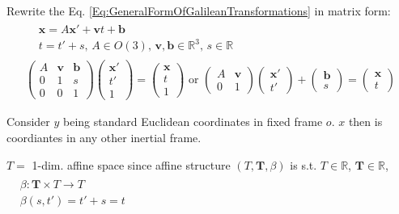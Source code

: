 \documentclass[10pt]{amsart}
\begin{document}
\begin{multicols*}{2}
Rewrite the Eq. \ref{Eq:GeneralFormOfGalileanTransformations} in matrix form:
\[
\begin{gathered}
\begin{aligned}
& \mathbf{x} = A \mathbf{x}' + \mathbf{v} t + \mathbf{b} \\ 
& t = t'+ s, \, A \in O(3), \, \mathbf{v}, \mathbf{b} \in \mathbb{R}^3, \, s \in \mathbb{R}
\end{aligned} \\
\left( \begin{matrix} A & \mathbf{v} & \mathbf{b} \\ 0 & 1 & s \\ 0 & 0 & 1 \end{matrix} \right) \left(\begin{matrix} \mathbf{x}' \\ t' \\ 1 \end{matrix} \right) = \left( \begin{matrix} \mathbf{x} \\ t  \\ 1 \end{matrix} \right) \text{ or } \left( \begin{matrix} A & \mathbf{v} \\  0 & 1 \end{matrix} \right) \left( \begin{matrix}\mathbf{x}' \\ t' \end{matrix} \right) + \left( \begin{matrix} \mathbf{b} \\ s \end{matrix} \right) = \left(\begin{matrix} \mathbf{x} \\ t \end{matrix} \right)
\end{gathered}
\]

Consider $y$ being standard Euclidean coordinates in fixed frame $o$. $x$ then is coordiantes in any other inertial frame.

$T =$ 1-dim. affine space since affine structure $(T, \mathbf{T}, \beta)$ is s.t. $T\in \mathbb{R}$, $\mathbf{T} \in \mathbb{R}$, $\begin{aligned} & \quad \\ 
& \beta : \mathbf{T} \times T \to T \\
& \beta(s,t') = t' + s = t\end{aligned}$ \\




\end{multicols*}
\end{document}
